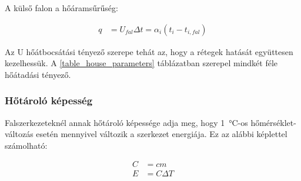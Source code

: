 A külső falon a hőáramsűrűség:

\begin{equation}\label{eq_hoveszteseg}
\begin{aligned}
q &= U_{fal}\Delta t = \alpha_i\left(t_i-t_{i,fal}\right)
\end{aligned}
\end{equation}

Az U hőátbocsátási tényező szerepe tehát az, hogy a rétegek hatását együttesen kezelhessük. A \ref{table_house_parameters} táblázatban szerepel mindkét féle hőátadási tényező. 



\begin{table}[H]
	\footnotesize
	\centering
	\caption{Hőközlés fajtái}
	
	\label{tab:HeatExchangeTypes}
\end{table}

\subsubsection*{Hőtároló képesség}

Falszerkezeteknél annak hőtároló képessége adja meg, hogy \SI{1}{\celsius}-os hőmérséklet-változás esetén mennyivel változik a szerkezet energiája. Ez az alábbi képlettel számolható:

\begin{equation}\label{eq_hotarolo}
\begin{aligned}
C &= cm\\[10pt]
E &= C\Delta T
\end{aligned}
\end{equation}



\begin{table}[H]
	\footnotesize
	\centering
	\caption{Jelölések}
	
	\label{tab:Nomenclature}
\end{table}


